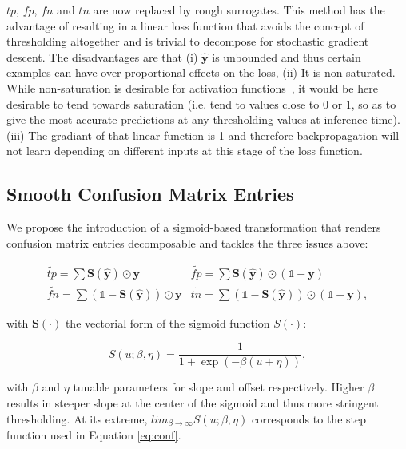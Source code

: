 \(tp\), \(fp\), \(fn\) and \(tn\) are now replaced by rough surrogates. This method has the advantage of resulting in a linear loss function that avoids the concept of thresholding altogether and is trivial to decompose for stochastic gradient descent. The disadvantages are that (i) \(\hat{\mathbf{y}}\) is unbounded and thus certain examples can have over-proportional effects on the loss, (ii) It is non-saturated. While non-saturation is desirable for activation functions~\cite{saturation}, it would be here desirable to tend towards saturation (i.e. tend to values close to 0 or 1, so as to give the most accurate predictions at any thresholding values at inference time). (iii) The gradiant of that linear function is 1 and therefore backpropagation will not learn depending on different inputs at this stage of the loss function.


\subsection{Smooth Confusion Matrix Entries}

We propose the introduction of a sigmoid-based transformation that renders confusion matrix entries decomposable and tackles the three issues above:

\begin{equation}
\label{eq:smooth}
\begin{array}{ll} \widetilde{\mathit{tp}} = \sum \mathbf{S}(\hat{\mathbf{y}}) \odot \mathbf{y}  & \widetilde{\mathit{fp}} = \sum \mathbf{S}(\hat{\mathbf{y}}) \odot (\mathds{1} - \mathbf{y}) \\ \widetilde{\mathit{fn}} = \sum (\mathds{1} - \mathbf{S}(\hat{\mathbf{y}})) \odot \mathbf{y} & \widetilde{\mathit{tn}} = \sum (\mathds{1} - \mathbf{S}(\hat{\mathbf{y}})) \odot (\mathds{1} - \mathbf{y}),
\end{array}
\end{equation}

with $\mathbf{S}(\cdot)$ the vectorial form of the sigmoid function $S(\cdot)$:

\begin{equation}
S(u; \beta, \eta)=\frac{1}{1+\exp (-\beta (u + \eta))},
\end{equation}

with \(\beta\) and \(\eta\) tunable parameters for slope and offset respectively. Higher \(\beta\) results in steeper slope at the center of the sigmoid and thus more stringent thresholding. At its extreme, \(lim_{\beta\to\infty} S(u; \beta, \eta)\) corresponds to the step function used in Equation \ref{eq:conf}.


